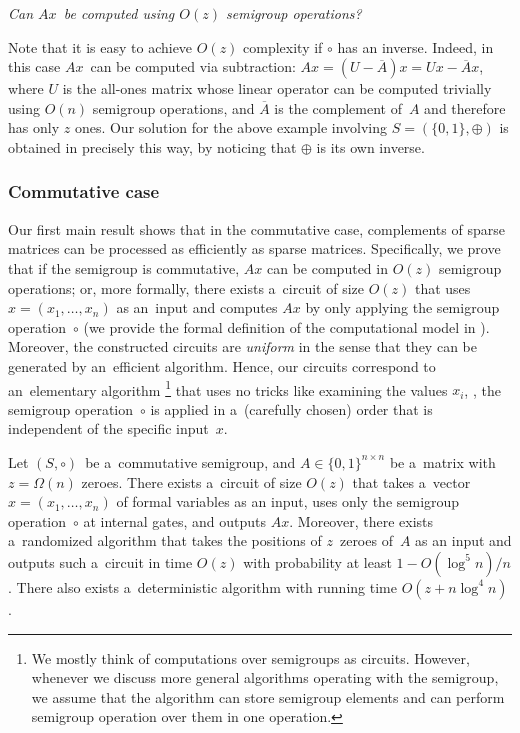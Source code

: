 \documentclass{toc}
\begin{document}
\vspace{2mm}
\emph{Can $Ax$~be computed using $O(z)$ semigroup operations?}
\vspace{2mm}

\noindent
Note that it is easy to achieve $O(z)$ complexity if $\circ$ has an inverse.
Indeed, in this case $Ax$~can be computed via subtraction:
$Ax = (U-\overline{A})x = Ux - \overline{A}x$, where $U$ is the all-ones matrix
whose linear operator can be computed trivially using $O(n)$ semigroup
operations, and $\overline{A}$ is the complement of~$A$ and therefore has only
$z$ ones. Our solution for the above example involving $S=(\{0,1\}, \oplus)$
is obtained in precisely this way, by noticing that $\oplus$ is its own inverse.

\subsubsection{Commutative case}
Our first main result shows that in the commutative case, complements
of sparse matrices can be processed as
efficiently as sparse matrices. Specifically, we prove
that if the semigroup is commutative, $Ax$ can be computed in $O(z)$ semigroup
operations; or, more formally, there exists
a~circuit of size $O(z)$ that uses $x=(x_1, \dotsc, x_n)$ as
an~input and computes $Ax$ by only applying the semigroup
operation~$\circ$ (we provide the formal definition of the
computational model in ). Moreover,
the constructed circuits are \emph{uniform} in the sense that they
can be generated by an~efficient algorithm. Hence, our circuits
correspond to an~elementary algorithm%
\footnote{We mostly think of computations over semigroups as circuits. However, whenever we discuss more general algorithms operating with the semigroup, we assume that the algorithm can store semigroup elements and can perform semigroup operation over them in one operation.}
 that uses no tricks like examining the
values $x_i$, \ie, the semigroup operation~$\circ$ is applied in a~(carefully
chosen) order that is independent of the specific input~$x$.

\begin{theorem}
\label{thm:upperboundold}
Let $(S, \circ)$~be a~commutative semigroup,
and $A \in \{0,1\}^{n \times n}$ be a~matrix
with~$z=\Omega(n)$ zeroes.
There exists a~circuit of size $O(z)$ that takes
a~vector $x = (x_1,\ldots, x_n)$ of formal variables as an input,
uses only the semigroup operation~$\circ$ at internal gates,
and outputs $Ax$. Moreover, there exists a~randomized
algorithm that takes the positions of $z$~zeroes of~$A$
as an input and outputs such a~circuit in time $O(z)$
with probability at least $1-O(\log^5n)/n$. There also
exists a~deterministic algorithm with running time $O(z+n\log^4n)$.
\end{theorem}
\end{document}
